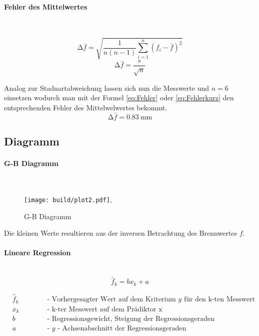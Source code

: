 \paragraph{Fehler des Mittelwertes} \mbox{} \\
\begin{multicols}{2}
    \begin{equation}
    \label{eq:Fehler}
    \increment \bar{f} = \sqrt{\frac{1}{n(n-1)} \sum_{i=1}^n (f_i - \bar{f})^2}
    \end{equation}\break
    \begin{equation}
    \label{eq:Fehlerkurz}
    \increment \bar{f} =\frac{s}{\sqrt{n}}
    \end{equation}
\end{multicols}

Analog zur Stadnartabweichung lassen sich nun die Messwerte und $n=6$ einsetzen wodurch man mit der Formel \eqref{eq:Fehler} oder \eqref{eq:Fehlerkurz}
 den entsprechenden Fehler des Mittelwelwertes bekommt.
\begin{equation}
\increment \bar{f}= \SI{0.83}{\milli\meter}
\end{equation}
\newpage

\subsection{Diagramm}
\paragraph{G-B Diagramm} \mbox{} \\

\begin{figure}
    \centering
    \texttt{[image: build/plot2.pdf]},
   \caption{G-B Diagramm}
   \label{fig:G-B}
\end{figure}

Die kleinen Werte resultieren aus der inversen Betrachtung des Brennwertes $f$.

\paragraph{Lineare Regression} \mbox{}\\

\begin{equation}
\label{eq:LR}
\hat{f}_k = bx_k +a 
\end{equation}

\begin{align*}
&\hat{f}_k   &&\text{- Vorhergesagter Wert auf dem Kriterium $y$ für den k-ten Messwert} \\
&x_k  \hspace{1cm} &&\text{- k-ter Messwert auf dem Prädiktor x}  \\
&b  &&\text{- Regressionsgewicht, Steigung der Regressionsgeraden } \\
&a &&\text{- $y$ - Achsenabschnitt der Regressionsgeraden} 
\end{align*}

